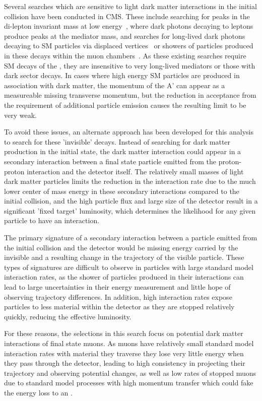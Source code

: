 Several searches which are sensitive to light dark matter interactions in the initial collision have been conducted in CMS.
These include searching for peaks in the di-lepton invariant mass at low energy~\cite{cmscollaboration2023search}, where dark photons decaying to leptons produce peaks at the mediator mass, and searches for long-lived dark photons decaying to SM particles via displaced vertices~\cite{cmsLLP_2022} or showers of particles produced in these decays within the muon chambers~\cite{Tumasyan_2021}.
As these existing searches require SM decays of the \aprime, they are insensitive to very long-lived mediators or those with dark sector decays.
In cases where high energy SM particles are produced in association with dark matter, the momentum of the A' can appear as a measureable missing transverse momentum, but the reduction in acceptance from the requirement of additional particle emission causes the resulting limit to be very weak.

To avoid these issues, an alternate approach has been developed for this analysis to search for these 'invisible' decays.
Instead of searching for dark matter production in the initial state, the dark matter interaction could appear in a secondary interaction between a final state particle emitted from the proton-proton interaction and the detector itself.
The relatively small masses of light dark matter particles limits the reduction in the interaction rate due to the much lower center of mass energy in these secondary interactions compared to the initial collision, and the high particle flux and large size of the detector result in a significant 'fixed target' luminosity, which determines the likelihood for any given particle to have an interaction.

The primary signature of a secondary interaction between a particle emitted from the initial collision and the detector would be missing energy carried by the invisible \aprime and a resulting change in the trajectory of the visible particle.
These types of signatures are difficult to observe in particles with large standard model interaction rates, as the shower of particles produced in their interactions can lead to large uncertainties in their energy measurement and little hope of observing trajectory differences.
In addition, high interaction rates expose particles to less material within the detector as they are stopped relatively quickly, reducing the effective luminosity.

For these reasons, the selections in this search focus on potential dark matter interactions of final state muons.
As muons have relatively small standard model interaction rates with material they traverse they lose very little energy when they pass through the detector, leading to high consistency in projecting their trajectory and observing potential changes, as well as low rates of stopped muons due to standard model processes with high momentum transfer which could fake the energy loss to an \aprime.

